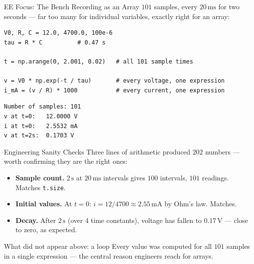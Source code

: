 \documentclass[9pt,aspectratio=169,xcolor=table]{beamer}
\begin{document}
\begin{frame}[fragile]{EE Focus: The Bench Recording as an Array}
    \leavevmode
    $101$ samples, every $20\,\text{ms}$ for two seconds --- far too many
    for individual variables, exactly right for an array:

\begin{lstlisting}
V0, R, C = 12.0, 4700.0, 100e-6
tau = R * C          # 0.47 s

t = np.arange(0, 2.001, 0.02)   # all 101 sample times

v = V0 * np.exp(-t / tau)       # every voltage, one expression
i_mA = (v / R) * 1000           # every current, one expression
\end{lstlisting}
\begin{lstlisting}[style=skoutput]
Number of samples: 101
v at t=0:   12.0000 V
i at t=0:   2.5532 mA
v at t=2s:  0.1703 V
\end{lstlisting}
\end{frame}

\begin{frame}{Engineering Sanity Checks}
    \leavevmode
    Three lines of arithmetic produced $202$ numbers --- worth
    confirming they are the right ones:

    \vspace{2mm}
    \begin{itemize}\small
        \item \textbf{Sample count.} $2\,\text{s}$ at $20\,\text{ms}$
              intervals gives $100$ intervals, $101$ readings. Matches
              \texttt{t.size}.
        \item \textbf{Initial values.} At $t=0$: $i = 12/4700 \approx
              2.55\,\text{mA}$ by Ohm's law. Matches.
        \item \textbf{Decay.} After $2\,\text{s}$ (over 4 time
              constants), voltage has fallen to $0.17\,\text{V}$ ---
              close to zero, as expected.
    \end{itemize}

    \vspace{3mm}
    \begin{alertblock}{What did not appear above: a loop}
        Every value was computed for all $101$ samples in a single
        expression --- the central reason engineers reach for arrays.
    \end{alertblock}
\end{frame}

\end{document}
